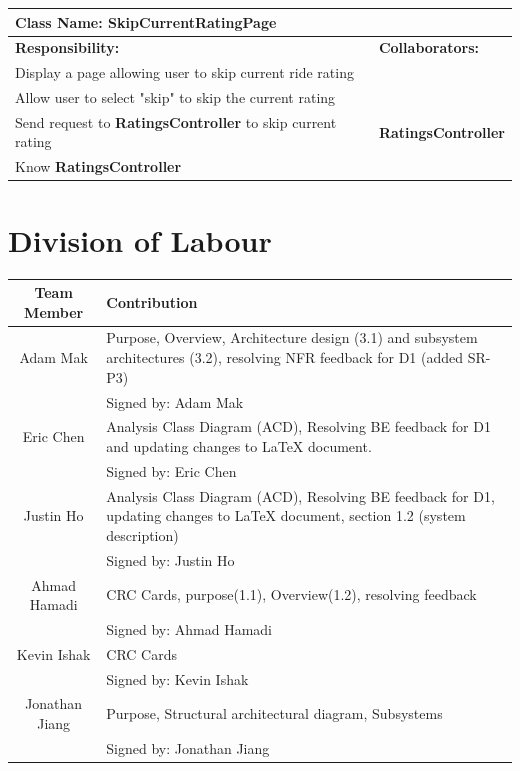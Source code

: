 \documentclass[]{article}
\begin{document}
\begin{table}[H]
    \centering
    \begin{tabular}{|p{5cm}|p{5cm}|}
    \hline
    \multicolumn{2}{|l|}{\textbf{Class Name:} SkipCurrentRatingPage} \\
    \hline
    \textbf{Responsibility:} & \textbf{Collaborators:} \\
    \hline
    Display a page allowing user to skip current ride rating & \phantom{} \\
    \hline
    Allow user to select "skip" to skip the current rating & \phantom{} \\
    \hline
    Send request to \textbf{RatingsController} to skip current rating & \textbf{RatingsController} \\
    \hline
     Know \textbf{RatingsController}  & \phantom{} \\
    \hline
    \end{tabular}
\end{table}



    

\appendix
\section{Division of Labour}
\label{sec:division_of_labour}
\begin{center} \begin{tabular} {|c|p{35em}|}
	\hline
	\textbf{Team Member} & \textbf{Contribution} \\
	\hline \hline
	Adam Mak & Purpose, Overview, Architecture design (3.1) and subsystem architectures (3.2), resolving NFR feedback for D1 (added SR-P3)\\
	& Signed by: Adam Mak\\
	\hline
	Eric Chen & Analysis Class Diagram (ACD), Resolving BE feedback for D1 and updating changes to LaTeX document.\\
	& Signed by: Eric Chen\\
	\hline
	Justin Ho & Analysis Class Diagram (ACD), Resolving BE feedback for D1, updating changes to LaTeX document, section 1.2 (system description)\\
	& Signed by: Justin Ho\\
	\hline
	Ahmad Hamadi & CRC Cards, purpose(1.1), Overview(1.2), resolving feedback\\
	& Signed by: Ahmad Hamadi \\
	\hline
	Kevin Ishak & CRC Cards \\
	& Signed by: Kevin Ishak \\
	\hline
	Jonathan Jiang & Purpose, Structural architectural diagram, Subsystems\\
	& Signed by: Jonathan Jiang\\
	\hline
\end{tabular} \end{center}
\end{document}
